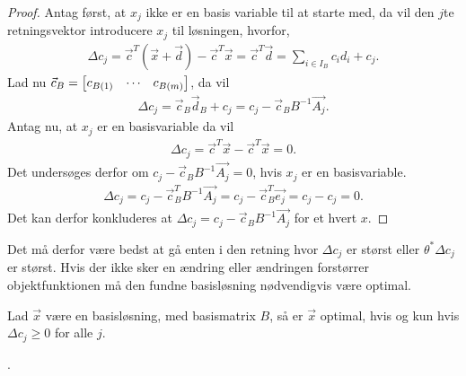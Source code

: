 \begin{proof}
Antag først, at $x_j$ ikke er en basis variable til at starte med, da vil den $j$te retningsvektor introducere $x_j$ til løsningen, hvorfor,
\begin{align*}
\Delta c_j = \vec{c}^T(\vec{x}+ \vec{d}) - \vec{c}^T\vec{x} = \vec{c}^T\vec{d} = \sum_{i \in I_B} c_i d_i + c_j.
\end{align*}
Lad nu $\vec{c}_B = \begin{bmatrix} c_{B(1)}& \cdots & c_{B(m)} \end{bmatrix}$, da vil
\begin{align}
\Delta c_j =\vec{c}_B\vec{d}_B+ c_j = c_j-\vec{c}_B B^{-1}\vec{A_j}.
\end{align}
Antag nu, at $x_j$ er en basisvariable da vil 
\begin{align*}
\Delta c_j = \vec{c}^T\vec{x}- \vec{c}^T\vec{x} = 0.
\end{align*}
Det undersøges derfor om $ c_j-\vec{c}_B B^{-1}\vec{A_j}= 0$, hvis $x_j$ er en basisvariable.
\begin{align*}
 \Delta c_j = c_j-\vec{c}_B^T B^{-1}\vec{A_j} = c_j - \vec{c}_B^T \vec{e_j} = c_j - c_j = 0.
\end{align*}
Det kan derfor konkluderes at $\Delta c_j = c_j-\vec{c}_B B^{-1}\vec{A_j}$ for et hvert $x$.
\end{proof}
Det må derfor være bedst at gå enten i den retning hvor $\Delta c_j$ er størst eller $\theta^*\Delta c_j$ er størst. 
Hvis der ikke sker en ændring eller ændringen forstørrer objektfunktionen må den fundne basisløsning nødvendigvis være optimal.
\begin{stn}
Lad $\vec{x}$ være en basisløsning, med basismatrix $B$, så er $\vec{x}$ optimal, hvis og kun hvis $\Delta c_j \geq 0$ for alle $j$.
\label{stn:optimalDeltaC}
\end{stn}.
